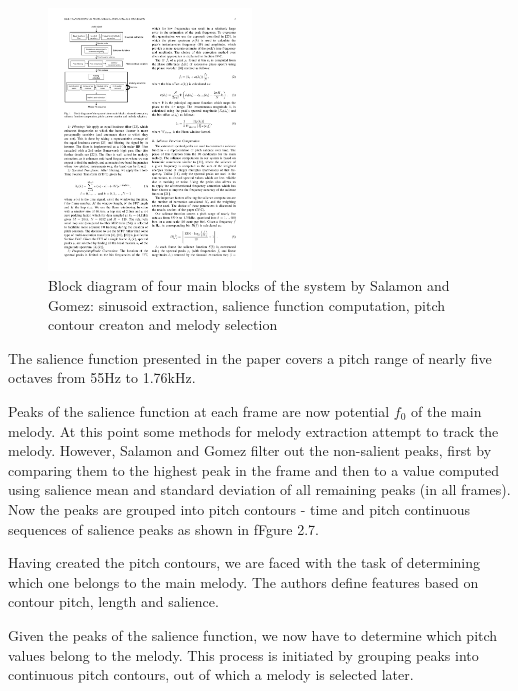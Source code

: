 \begin{figure}
  \vspace{-20pt}

  \begin{center}
    \includegraphics[width=0.48\textwidth]{Figures/salamon4blocksdiagram}
  \end{center}
  \caption{Block diagram of four main blocks of the system by Salamon and Gomez: sinusoid extraction, salience function computation, pitch contour creaton and melody selection}
\end{figure}

The salience function presented in the paper covers a pitch range of nearly five octaves from 55Hz to 1.76kHz.

Peaks of the salience function at each frame are now potential $f_{0}$ of the main melody. At this point some methods for melody extraction attempt to track the melody. However, Salamon and Gomez filter out the non-salient peaks, first by comparing them to the highest peak in the frame and then to a value computed using salience mean and standard deviation of all remaining peaks (in all frames). Now the peaks are grouped into pitch contours - time and pitch continuous sequences of salience peaks as shown in fFgure 2.7.

Having created the pitch contours, we are faced with the task of determining which one belongs to the main melody. The authors define features based on contour pitch, length and salience.

Given the peaks of the salience function, we now have to determine which pitch values belong to the melody. This process is initiated by grouping peaks into continuous pitch contours, out of which a melody is selected later. 

